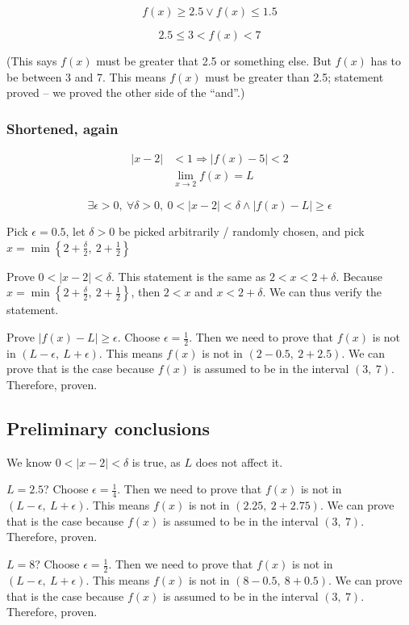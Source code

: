 \documentclass[
]{article}
\begin{document}
$$f(x) \geq 2.5 \vee f(x) \leq 1.5$$

$$2.5 \leq 3 < f(x) < 7$$

(This says $f(x)$ must be greater that 2.5 or something else. But
$f(x)$ has to be between 3 and 7. This means $f(x)$ must be greater
than 2.5; statement proved -- we proved the other side of the ``and''.)


\subsubsection{Shortened, again}

\begin{align*}
|x - 2| &< 1 \Rightarrow \left| f(x) - 5 \right| < 2
 \\
&\lim_{x \rightarrow 2}{f(x) = L}
\end{align*}


$$\exists\epsilon > 0,\ \forall\delta > 0,\ 0 < |x - 2| < \delta \land \left| f(x) - L \right| \geq \epsilon$$

Pick $\epsilon = 0.5$, let $\delta > 0$ be picked arbitrarily /
randomly chosen, and pick
$x = \min\left\{ 2 + \frac{\delta}{2},\ 2 + \frac{1}{2} \right\}$

Prove $0 < |x - 2| < \delta$. This statement is the same as
$2 < x < 2 + \delta$. Because
$x = \min\left\{ 2 + \frac{\delta}{2},\ 2 + \frac{1}{2} \right\}$,
then $2 < x$ and $x < 2 + \delta$. We can thus verify the statement.

Prove $\left| f(x) - L \right| \geq \epsilon$. Choose
$\epsilon = \frac{1}{2}$. Then we need to prove that $f(x)$ is not
in $(L - \epsilon,\ L + \epsilon)$. This means $f(x)$ is not in
$(2 - 0.5,\ 2 + 2.5)$. We can prove that is the case because $f(x)$
is assumed to be in the interval $(3,\ 7)$. Therefore, proven.


\subsection{Preliminary conclusions}

We know $0 < |x - 2| < \delta$ is true, as $L$ does not affect it.

$L = 2.5$? Choose $\epsilon = \frac{1}{4}$. Then we need to prove
that $f(x)$ is not in $(L - \epsilon,\ L + \epsilon)$. This means
$f(x)$ is not in $(2.25,\ 2 + 2.75)$. We can prove that is the case
because $f(x)$ is assumed to be in the interval $(3,\ 7)$.
Therefore, proven.

$L = 8$? Choose $\epsilon = \frac{1}{2}$. Then we need to prove that
$f(x)$ is not in $(L - \epsilon,\ L + \epsilon)$. This means
$f(x)$ is not in $(8 - 0.5,\ 8 + 0.5)$. We can prove that is the
case because $f(x)$ is assumed to be in the interval $(3,\ 7)$.
Therefore, proven.
\end{document}
